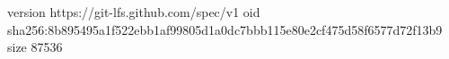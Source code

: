 version https://git-lfs.github.com/spec/v1
oid sha256:8b895495a1f522ebb1af99805d1a0dc7bbb115e80e2cf475d58f6577d72f13b9
size 87536
